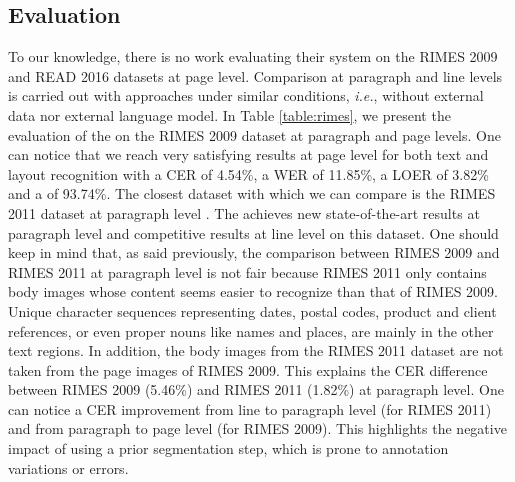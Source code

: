 \subsection{Evaluation}

To our knowledge, there is no work evaluating their system on the RIMES 2009 and READ 2016 datasets at page level. Comparison at paragraph and line levels is carried out with approaches under similar conditions, \textit{i.e.}, without external data nor external language model. In Table \ref{table:rimes}, we present the evaluation of the \modelacc{} on the RIMES 2009 dataset at paragraph and page levels. One can notice that we reach very satisfying results at page level for both text and layout recognition with a CER of 4.54\%, a WER of 11.85\%, a LOER of 3.82\% and a  of 93.74\%.
The closest dataset with which we can compare is the RIMES 2011 dataset at paragraph level \cite{RIMES}. The \modelacc{} achieves new state-of-the-art results at paragraph level and competitive results at line level on this dataset. One should keep in mind that, as said previously, the comparison between RIMES 2009 and RIMES 2011 at paragraph level is not fair because RIMES 2011 only contains body images whose content seems easier to recognize than that of RIMES 2009. Unique character sequences representing dates, postal codes, product and client references, or even proper nouns like names and places, are mainly in the other text regions. 
In addition, the body images from the RIMES 2011 dataset are not taken from the page images of RIMES 2009. This explains the CER difference between RIMES 2009 (5.46\%) and RIMES 2011 (1.82\%) at paragraph level. One can notice a CER improvement from line to paragraph level (for RIMES 2011) and from paragraph to page level (for RIMES 2009). This highlights the negative impact of using a prior segmentation step, which is prone to annotation variations or errors.

